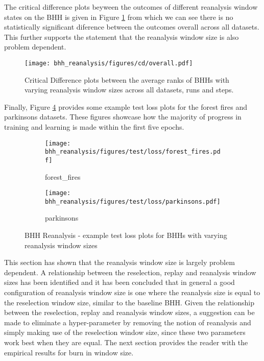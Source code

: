 The critical difference plots beyween the outcomes of different reanalysis window states on the \Ac{BHH} is given in Figure \ref{fig:results:reanalysis:descriptive:cd} from which we can see there is no statistically significant diference between the outcomes overall across all datasets. This further supports the statement that the reanalysis window size is also problem dependent.


\begin{figure}[htbp]
      \centering
      \texttt{[image: bhh\_reanalysis/figures/cd/overall.pdf]}
      \caption{Critical Difference plots between the average ranks of \Acsp{BHH} with varying reanalysis window sizes across all datasets, runs and steps.}
      \label{fig:results:reanalysis:descriptive:cd}
\end{figure}

Finally, Figure \ref{fig:results:reanalysis:figures:loss} provides some example test loss plots for the forest fires and parkinsons datasets. These figures showcase how the majority of progress in training and learning is made within the first five epochs.


\begin{figure}[htbp]
      \begin{subfigure}{0.5\textwidth}
            \centering
            \texttt{[image: bhh\_reanalysis/figures/test/loss/forest\_fires.pdf]}
            \caption{forest\_fires}
            \label{fig:results:reanalysis:figures:loss1}
      \end{subfigure}
      \begin{subfigure}{0.5\textwidth}
            \centering
            \texttt{[image: bhh\_reanalysis/figures/test/loss/parkinsons.pdf]}
            \caption{parkinsons}
            \label{fig:results:reanalysis:figures:loss2}
      \end{subfigure}
      \caption{\Acs{BHH} Reanalysis - example test loss plots for \Acsp{BHH} with varying reanalysis window sizes}
      \label{fig:results:reanalysis:figures:loss}
\end{figure}

This section has shown that the reanalysis window size is largely problem dependent. A relationship between the reselection, replay and reanalysis window sizes has been identified and it has been concluded that in general a good configuration of reanalysis window size is one where the reanalysis size is equal to the reselection window size, similar to the baseline \Ac{BHH}. Given the relationship between the reselection, replay and reanalysis window sizes, a suggestion can be made to eliminate a hyper-parameter by removing the notion of reanalysis and simply making use of the  reselection window size, since these two parameters work best when they are equal. The next section provides the reader with the empirical results for burn in window size.



